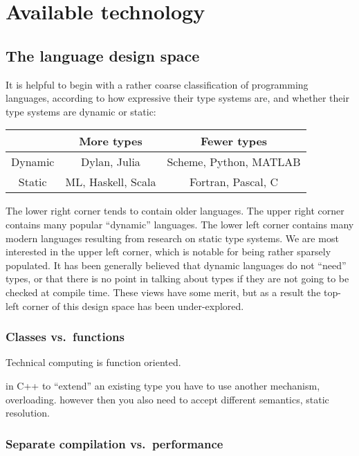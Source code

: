 \chapter{Available technology}


\section{The language design space}

It is helpful to begin with a rather coarse classification of programming
languages, according to how expressive their type systems are, and whether
their type systems are dynamic or static:

\vspace{3ex}

\begin{tabular}{|c||c|c|}
\hline 
 & More types & Fewer types\tabularnewline
\hline 
\hline 
Dynamic & Dylan, Julia & Scheme, Python, MATLAB\tabularnewline
\hline 
Static & ML, Haskell, Scala & Fortran, Pascal, C\tabularnewline
\hline 
\end{tabular}

\vspace{3ex}


The lower right corner tends to contain older languages. The upper right corner
contains many popular ``dynamic'' languages. The lower left corner contains
many modern languages resulting from research on static type systems.
We are most interested in the upper left corner, which is notable for being
rather sparsely populated. It has been generally believed that dynamic
languages do not ``need'' types, or that there is no point in talking about
types if they are not going to be checked at compile time. These views have
some merit, but as a result the top-left corner of this design space has
been under-explored.

\subsection{Classes vs.\ functions}

Technical computing is function oriented.

in C++ to ``extend'' an existing type you have to use another mechanism,
overloading.
however then you also need to accept different semantics, static resolution.


\subsection{Separate compilation vs.\ performance}

